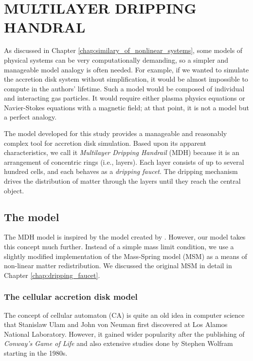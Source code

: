 \chapter{MULTILAYER DRIPPING HANDRAL}
    \label{chap:multilayer_dripping_handrail}
    \thispagestyle{empty}

    As discussed in Chapter \ref{chap:similary_of_nonlinear_systems}, some models of physical systems can be very computationally demanding, so a simpler and manageable model analogy is often needed. For example, if we wanted to simulate the accretion disk system without simplification, it would be almost impossible to compute in the authors' lifetime. Such a model would be composed of individual and interacting gas particles. It would require either plasma physics equations or Navier-Stokes equations with a magnetic field; at that point, it is not a model but a perfect analogy. 

    The model developed for this study provides a manageable and reasonably complex tool for accretion disk simulation. Based upon its apparent characteristics, we call it \emph{Multilayer Dripping Handrail} (MDH) because it is an arrangement of concentric rings (i.e., layers). Each layer consists of up to several hundred cells, and each behaves as a \emph{dripping faucet}. The dripping mechanism drives the distribution of matter through the layers until they reach the central object.

\section{The model}
    The MDH model is inspired by the model created by \citep{yonehara1997}. However, our model takes this concept much further. Instead of a simple mass limit condition, we use a slightly modified implementation of the Mass-Spring model (MSM) as a means of non-linear matter redistribution. We discussed the original MSM in detail in Chapter \ref{chap:dripping_faucet}. 

\subsection{The cellular accretion disk model}
    The concept of cellular automaton (CA) is quite an old idea in computer science that Stanislaw Ulam and John von Neuman first discovered at Los Alamos National Laboratory. However, it gained wider popularity after the publishing of \emph{Conway's Game of Life} \citep{gardner1970} and also extensive studies done by Stephen Wolfram starting in the 1980s.

